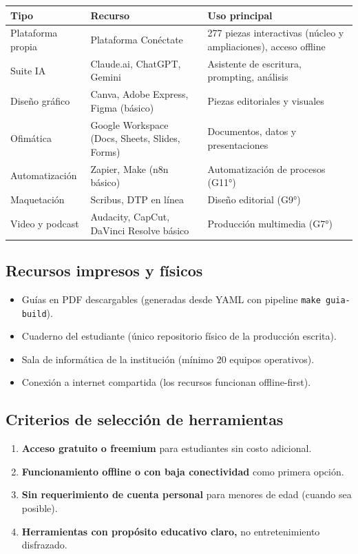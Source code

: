 \documentclass[12pt, a4paper]{article}
\begin{document}
\begin{center}
\begin{tabular}{|L{3cm}|L{5cm}|L{6cm}|}
\hline
{}
\color{white}\textbf{Tipo} &
\color{white}\textbf{Recurso} &
\color{white}\textbf{Uso principal} \\
\hline
Plataforma propia &
Plataforma Conéctate &
277 piezas interactivas (núcleo y ampliaciones), acceso offline \\
\hline
Suite IA &
Claude.ai, ChatGPT, Gemini &
Asistente de escritura, prompting, análisis \\
\hline
Diseño gráfico &
Canva, Adobe Express, Figma (básico) &
Piezas editoriales y visuales \\
\hline
Ofimática &
Google Workspace (Docs, Sheets, Slides, Forms) &
Documentos, datos y presentaciones \\
\hline
Automatización &
Zapier, Make (n8n básico) &
Automatización de procesos (G11°) \\
\hline
Maquetación &
Scribus, DTP en línea &
Diseño editorial (G9°) \\
\hline
Video y podcast &
Audacity, CapCut, DaVinci Resolve básico &
Producción multimedia (G7°) \\
\hline
\end{tabular}
\end{center}

\subsection{Recursos impresos y físicos}

\begin{itemize}
  \item Guías en PDF descargables (generadas desde YAML con pipeline \texttt{make guia-build}).
  \item Cuaderno del estudiante (único repositorio físico de la producción escrita).
  \item Sala de informática de la institución (mínimo 20 equipos operativos).
  \item Conexión a internet compartida (los recursos funcionan offline-first).
\end{itemize}

\subsection{Criterios de selección de herramientas}

\begin{enumerate}
  \item \textbf{Acceso gratuito o freemium} para estudiantes sin costo adicional.
  \item \textbf{Funcionamiento offline o con baja conectividad} como primera opción.
  \item \textbf{Sin requerimiento de cuenta personal} para menores de edad (cuando sea posible).
  \item \textbf{Herramientas con propósito educativo claro,} no entretenimiento disfrazado.
\end{enumerate}
\end{document}
